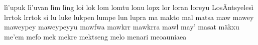 \documentclass[a4paper]{article}
\begin{document}
lì'upuk\hspace{2mm}
lì'uvan\hspace{2mm}
lìm\hspace{2mm}
lìng\hspace{2mm}
loi\hspace{2mm}
lok\hspace{2mm}
lom\hspace{2mm}
lomtu\hspace{2mm}
lonu\hspace{2mm}
lopx\hspace{2mm}
lor\hspace{2mm}
loran\hspace{2mm}
loreyu\hspace{2mm}
LosÄntsyelesì\hspace{2mm}
lrrtok\hspace{2mm}
lrrtok si\hspace{2mm}
lu\hspace{2mm}
luke\hspace{2mm}
lukpen\hspace{2mm}
lumpe\hspace{2mm}
lun\hspace{2mm}
lupra\hspace{2mm}
ma\hspace{2mm}
makto\hspace{2mm}
mal\hspace{2mm}
matsa\hspace{2mm}
maw\hspace{2mm}
mawey\hspace{2mm}
maweypey\hspace{2mm}
maweypeyyu\hspace{2mm}
mawfwa\hspace{2mm}
mawkrr\hspace{2mm}
mawkrra\hspace{2mm}
mawl\hspace{2mm}
may'\hspace{2mm}
masat\hspace{2mm}
mäkxu\hspace{2mm}
me'em\hspace{2mm}
mefo\hspace{2mm}
mek\hspace{2mm}
mekre\hspace{2mm}
mektseng\hspace{2mm}
melo\hspace{2mm}
menari\hspace{2mm}
meoauniaea\hspace{2mm}
\end{document}
